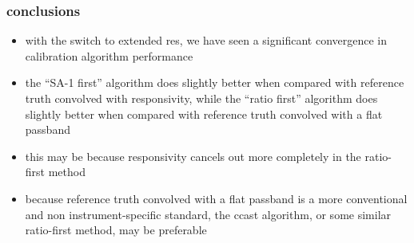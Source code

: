 \documentclass[11pt]{beamer}
\begin{document}
\begin{frame}
\frametitle{conclusions}

\begin{itemize}

  \item with the switch to extended res, we have seen a significant
    convergence in calibration algorithm performance 

  \item the {\noaa} ``SA-1 first'' algorithm does slightly better
    when compared with reference truth convolved with responsivity,
    while the {\ccast} ``ratio first'' algorithm does slightly
    better when compared with reference truth convolved with a flat
    passband

  \item this may be because responsivity cancels out more completely
    in the ratio-first method

  \item because reference truth convolved with a flat passband is a
    more conventional and non instrument-specific standard, the
    ccast algorithm, or some similar ratio-first method, may be
    preferable

\end{itemize}

\end{frame}
\end{document}
